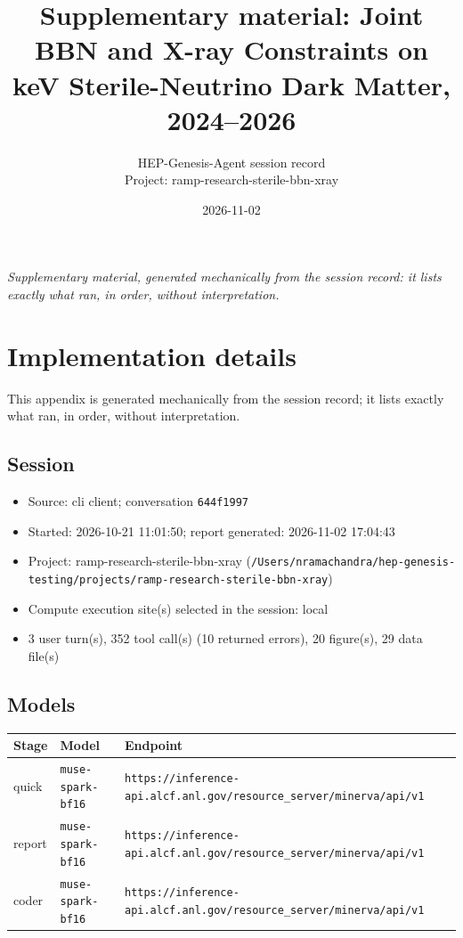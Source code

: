 \documentclass[11pt,a4paper]{article}
\title{Supplementary material: Joint BBN and X-ray Constraints on keV Sterile-Neutrino Dark Matter, 2024--2026}
\author{HEP-Genesis-Agent session record \\ \small Project: ramp-research-sterile-bbn-xray}
\date{2026-11-02}
\begin{document}
\maketitle
\noindent\textit{\small Supplementary material, generated mechanically from the session record: it lists exactly what ran, in order, without interpretation.}
\vspace{1em}



\appendix
\section{Implementation details}
\label{app:impl}
This appendix is generated mechanically from the session record; it lists exactly what ran, in order, without interpretation.
\subsection{Session}
\begin{itemize}
  \item Source: cli client; conversation \texttt{644f1997}
  \item Started: 2026-10-21 11:01:50; report generated: 2026-11-02 17:04:43
  \item Project: ramp-research-sterile-bbn-xray (\texttt{/\allowbreak{}Users/\allowbreak{}nramachandra/\allowbreak{}hep-genesis-testing/\allowbreak{}projects/\allowbreak{}ramp-research-sterile-bbn-xray})
  \item Compute execution site(s) selected in the session: local
  \item 3 user turn(s), 352 tool call(s) (10 returned errors), 20 figure(s), 29 data file(s)
\end{itemize}
\subsection{Models}
\begin{longtable}{@{}p{}p{}p{}@{}}
\toprule Stage & Model & Endpoint \\ \midrule \endhead
quick & \texttt{muse-spark-bf16} & \texttt{https:\allowbreak{}/\allowbreak{}/\allowbreak{}inference-api.alcf.anl.gov/\allowbreak{}resource\_\allowbreak{}server/\allowbreak{}minerva/\allowbreak{}api/\allowbreak{}v1} \\
report & \texttt{muse-spark-bf16} & \texttt{https:\allowbreak{}/\allowbreak{}/\allowbreak{}inference-api.alcf.anl.gov/\allowbreak{}resource\_\allowbreak{}server/\allowbreak{}minerva/\allowbreak{}api/\allowbreak{}v1} \\
coder & \texttt{muse-spark-bf16} & \texttt{https:\allowbreak{}/\allowbreak{}/\allowbreak{}inference-api.alcf.anl.gov/\allowbreak{}resource\_\allowbreak{}server/\allowbreak{}minerva/\allowbreak{}api/\allowbreak{}v1} \\
\bottomrule\end{longtable}
\end{document}
